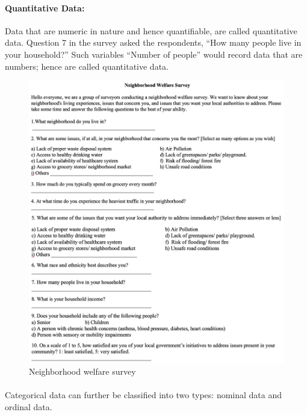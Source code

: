 \documentclass[a4paper, 11pt]{article}
\begin{document}
	\paragraph{Quantitative Data:}
	Data that are numeric in nature and hence quantifiable, are called quantitative data. Question 7 in the survey asked the respondents, “How many people live in your household?” Such variables “Number of people” would record data that are numbers; hence are called quantitative data. 
%
	\begin{figure}[h!]
		\includegraphics[width=\linewidth]{Neighborhood welfare survey.jpg}
		\caption{Neighborhood welfare survey}
		\label{pictureX}
	\end{figure}
%
	\paragraph{}Categorical data can further be classified into two types: nominal data and ordinal data.
%	
\end{document}
